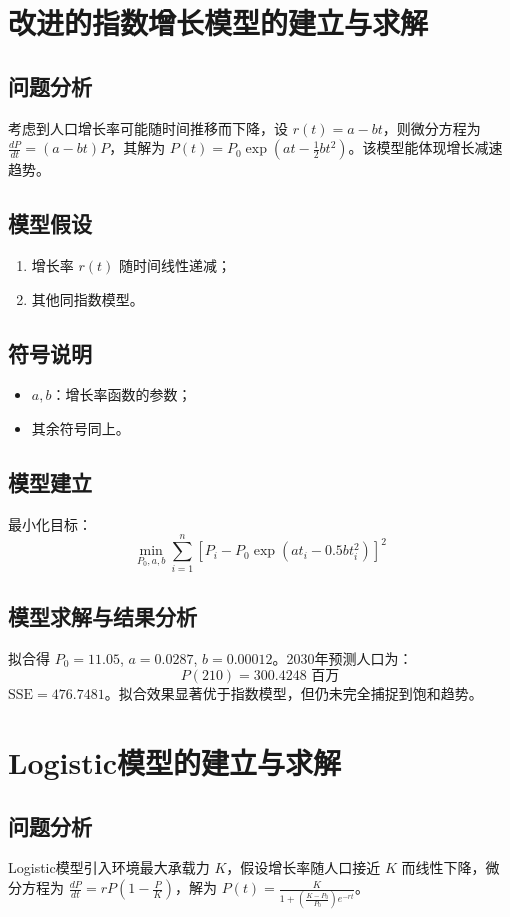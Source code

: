 \documentclass[12pt]{ctexart}
\begin{document}
\section{改进的指数增长模型的建立与求解}
\subsection{问题分析}
考虑到人口增长率可能随时间推移而下降，设 $r(t) = a - b t$，则微分方程为 $\frac{dP}{dt} = (a - b t) P$，其解为 $P(t) = P_0 \exp(a t - \frac{1}{2} b t^2)$。该模型能体现增长减速趋势。

\subsection{模型假设}
\begin{enumerate}
    \item 增长率 $r(t)$ 随时间线性递减；
    \item 其他同指数模型。
\end{enumerate}

\subsection{符号说明}
\begin{itemize}
    \item $a, b$：增长率函数的参数；
    \item 其余符号同上。
\end{itemize}

\subsection{模型建立}
最小化目标：
\[
\min_{P_0, a, b} \sum_{i=1}^{n} \left[ P_i - P_0 \exp(a t_i - 0.5 b t_i^2) \right]^2
\]

\subsection{模型求解与结果分析}
拟合得 $P_0 = 11.05$, $a = 0.0287$, $b = 0.00012$。2030年预测人口为：
\[
P(210) = 300.4248 \text{ 百万}
\]
$\mathrm{SSE} = 476.7481$。拟合效果显著优于指数模型，但仍未完全捕捉到饱和趋势。

\section{Logistic模型的建立与求解}
\subsection{问题分析}
Logistic模型引入环境最大承载力 $K$，假设增长率随人口接近 $K$ 而线性下降，微分方程为 $\frac{dP}{dt} = r P \left(1 - \frac{P}{K}\right)$，解为 $P(t) = \frac{K}{1 + \left(\frac{K - P_0}{P_0}\right) e^{-r t}}$。
\end{document}
